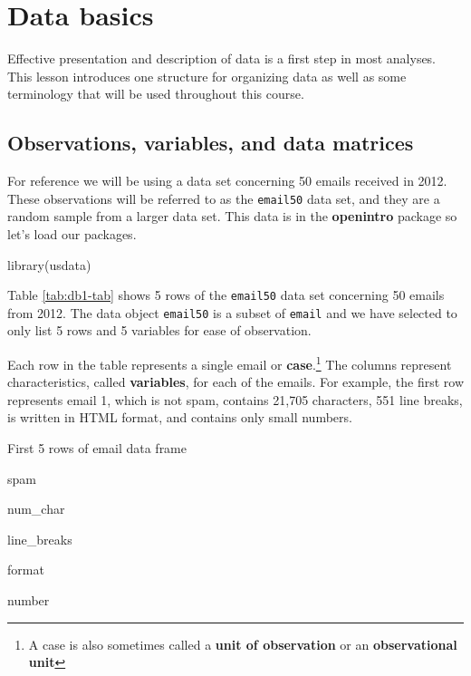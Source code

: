\documentclass[
]{book}
\newenvironment{Shaded}{\begin{snugshade}}{\end{snugshade}}
\newcommand{\FunctionTok}[1]{\textcolor[rgb]{0.00,0.00,0.00}{#1}}
\newcommand{\NormalTok}[1]{#1}
\begin{document}
\hypertarget{data-basics}{%
\section{Data basics}\label{data-basics}}

Effective presentation and description of data is a first step in most analyses. This lesson introduces one structure for organizing data as well as some terminology that will be used throughout this course.

\hypertarget{observations-variables-and-data-matrices}{%
\subsection{Observations, variables, and data matrices}\label{observations-variables-and-data-matrices}}

For reference we will be using a data set concerning 50 emails received in 2012. These observations will be referred to as the \texttt{email50} data set, and they are a random sample from a larger data set. This data is in the \textbf{openintro} package so let's load our packages.

\begin{Shaded}
\begin{Highlighting}[]
\FunctionTok{library}\NormalTok{(usdata)}
\end{Highlighting}
\end{Shaded}

Table \ref{tab:db1-tab} shows 5 rows of the \texttt{email50} data set concerning 50 emails from 2012. The data object \texttt{email50} is a subset of \texttt{email} and we have selected to only list 5 rows and 5 variables for ease of observation.

Each row in the table represents a single email or \textbf{case}.\footnote{A case is also sometimes called a \textbf{unit of observation} or an \textbf{observational unit}} The columns represent characteristics, called \textbf{variables}, for each of the emails. For example, the first row represents email 1, which is not spam, contains 21,705 characters, 551 line breaks, is written in HTML format, and contains only small numbers.

\label{tab:db1-tab}First 5 rows of email data frame

spam

num\_char

line\_breaks

format

number
\end{document}
